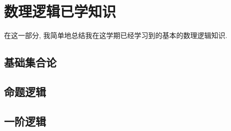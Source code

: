 \section{数理逻辑已学知识}
在这一部分, 我简单地总结我在这学期已经学习到的基本的数理逻辑知识.
\subsection{基础集合论}

\subsection{命题逻辑}

\subsection{一阶逻辑}